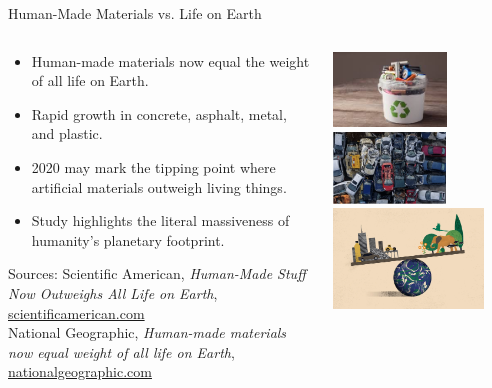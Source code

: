 \documentclass[aspectratio=169]{beamer}
\begin{document}
\begin{frame}{Human-Made Materials vs. Life on Earth}
   \begin{columns}[T]
    \begin{column}{0.58\textwidth}
      \begin{itemize}
        \item Human-made materials now equal the weight of all life on Earth.
        \item Rapid growth in concrete, asphalt, metal, and plastic.
        \item 2020 may mark the tipping point where artificial materials outweigh living things.
        \item Study highlights the literal massiveness of humanity's planetary footprint.
      \end{itemize}
      \vfill
     {\tiny Sources:
  Scientific American, \textit{Human-Made Stuff Now Outweighs All Life on Earth}, \href{https://www.scientificamerican.com/article/human-made-stuff-now-outweighs-all-life-on-earth/}{scientificamerican.com} \\
  National Geographic, \textit{Human-made materials now equal weight of all life on Earth}, \href{https://www.nationalgeographic.com/environment/article/human-made-materials-now-equal-weight-of-all-life-on-earth}{nationalgeographic.com}
  }
    \end{column}
    \begin{column}{0.42\textwidth}
     \centering
     \begin{minipage}[t]{0.4\textwidth}
       \includegraphics[height=2cm]{media/bat_recycle.png}
       \includegraphics[width=3cm]{media/car_scrap.png}
       \includegraphics[width=4cm]{media/bio_versus_artifact_mass_balance.png}
     \end{minipage}
    \end{column}

   \end{columns}
\end{frame}
\end{document}
